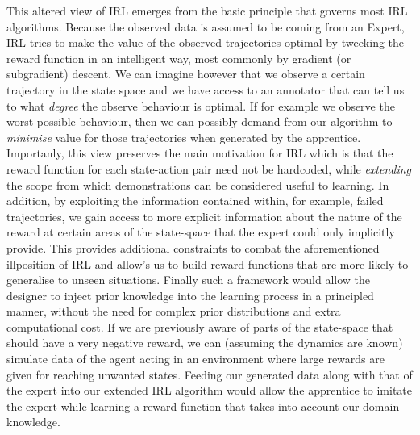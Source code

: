 \documentclass[conference]{IEEEtran}
\begin{document}
This altered view of IRL emerges from the basic principle that governs most IRL algorithms. Because the observed data is assumed to be coming from an Expert, IRL tries to make the value of the observed trajectories optimal by tweeking the reward function in an intelligent way, most commonly by gradient (or subgradient) descent. We can imagine however that we observe a certain trajectory in the state space and we have access to an annotator that can tell us to what \emph{degree} the observe behaviour is optimal. If for example we observe the worst possible behaviour, then we can possibly demand from our algorithm to \emph{minimise} value for those trajectories when generated by the apprentice. Importanly, this view preserves the main motivation for IRL which is that the reward function for each state-action pair need not be hardcoded, while \emph{extending} the scope from which demonstrations can be considered useful to learning. In addition, by exploiting the information contained within, for example, failed trajectories, we gain access to more explicit information about the nature of the reward at certain areas of the state-space that the expert could only implicitly provide. This provides additional constraints to combat the aforementioned illposition of IRL and allow's us to build reward functions that are more likely to generalise to unseen situations. Finally such a framework would allow the designer to inject prior knowledge into the learning process in a principled manner, without the need for complex prior distributions and extra computational cost. If we are previously aware of parts of the state-space that should have a very negative reward, we can (assuming the dynamics are known) simulate data of the agent acting in an environment where large rewards are given for reaching unwanted states. Feeding our generated data along with that of the expert into our extended IRL algorithm would allow the apprentice to imitate the expert while learning a reward function that takes into account our domain knowledge.
\end{document}
